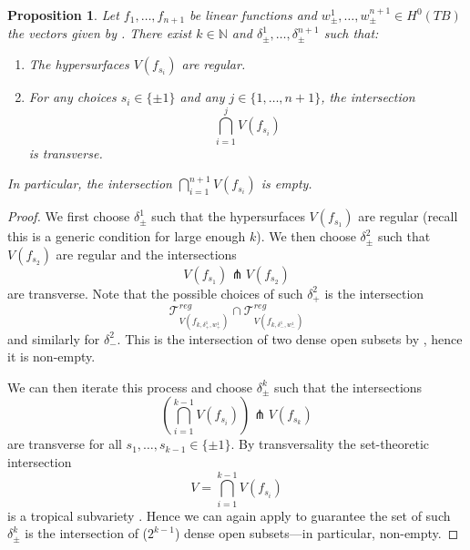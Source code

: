 \documentclass[10pt]{amsart}
\newtheorem{prop}[thm]{Proposition}
\theoremstyle{definition}
\theoremstyle{remark}
\def\N{\mathbb{N}}
\begin{document}
\begin{prop}\label{lem:transversality}
Let $f_1,\dots,f_{n+1}$ be  linear functions and $w^{1}_\pm,\dots,w^{n+1}_\pm \in H^0(TB)$ the vectors given by . 
There exist $k \in \N$ and $\delta^1_\pm, \dots, \delta^{n+1}_\pm$ such that:
\begin{enumerate}
    \item The hypersurfaces $V(f_{s_i})$ are regular.
    \item For any choices $s_i \in\{\pm1\}$ and any $j \in \{1,\dots,n+1\}$, the intersection
    $$
        \bigcap_{i=1}^{j}V(f_{s_i})
    $$
    is transverse.
\end{enumerate}
In particular, the intersection $\bigcap_{i=1}^{n+1}V(f_{s_i})$ is empty.
\end{prop}
\begin{proof}
    We first choose $\delta^1_\pm$ such that the hypersurfaces $V(f_{s_1})$ are regular (recall this is a generic condition for large enough $k$).
    We then choose $\delta^2_\pm$ such that $V(f_{s_2})$ are regular and the intersections
    $$
    V(f_{s_1}) \pitchfork V(f_{s_2})
    $$
    are transverse.
    Note that the possible choices of such $\delta^2_+$ is the intersection 
    $$
        \mathcal T^{reg}_{V(f_{k,\delta^1_{+},w^1_{+}})} \cap \mathcal T^{reg}_{V(f_{k,\delta^1_{-},w^1_{-}})}
    $$
    and similarly for $\delta^2_-$.
    This is the intersection of two dense open subsets by , hence it is non-empty.

    We can then iterate this process and choose $\delta^k_\pm$ such that the intersections
    $$
        \left(\bigcap_{i=1}^{k-1} V(f_{s_i})\right) \pitchfork V(f_{s_k})
    $$
    are transverse for all $s_1,\dots,s_{k-1} \in \{\pm1\}$.
    By transversality the set-theoretic intersection 
    $$
        V = \bigcap_{i=1}^{k-1} V(f_{s_i})
    $$
    is a tropical subvariety \cite[Section 4.2]{mikhalkin2006tropical}.
    Hence we can again apply  to guarantee the set of such $\delta^k_\pm$ is the intersection of ($2^{k-1}$) dense open subsets---in particular,  non-empty.
\end{proof}
\end{document}
